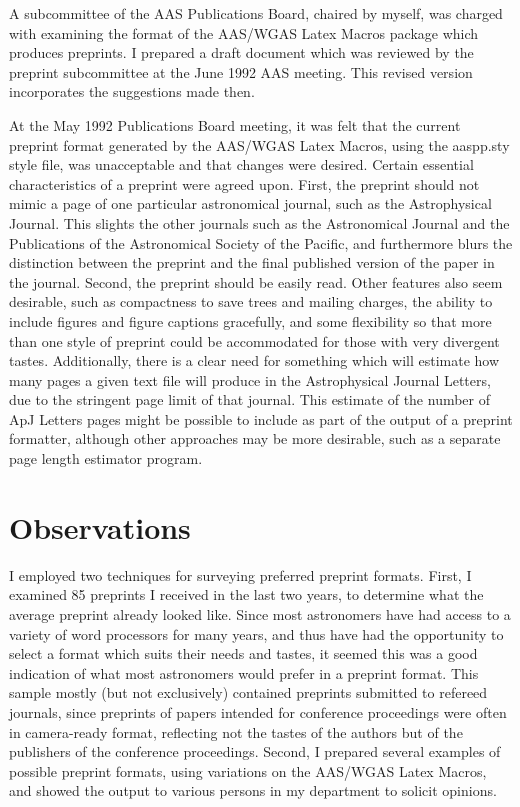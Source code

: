 A subcommittee of the AAS Publications Board, chaired by myself, was charged 
with examining the format of the AAS/WGAS Latex Macros package which
produces preprints.  I prepared a draft document which was reviewed by the
preprint subcommittee at the June 1992 AAS meeting.  This revised version 
incorporates the suggestions made then.

At the May 1992 Publications Board meeting, it was felt that the current 
preprint format generated by the AAS/WGAS Latex Macros, using the aaspp.sty 
style file, was unacceptable and that changes were desired.  Certain 
essential characteristics of a preprint were agreed upon.  First, the 
preprint should not mimic a page of one particular astronomical journal, 
such as the Astrophysical Journal.  This slights the other journals such 
as the Astronomical Journal and the Publications of the Astronomical 
Society of the Pacific, and furthermore blurs the distinction between the 
preprint and the final published version of the paper in the journal.
Second, the preprint should be easily read.  Other features also seem 
desirable, such as compactness to save trees and mailing charges, the 
ability to include figures and figure captions gracefully, and some 
flexibility so that more than one style of preprint could be accommodated 
for those with very divergent tastes.  Additionally, there is a clear need 
for something which will estimate how many pages a given text file will 
produce in the Astrophysical Journal Letters, due to the stringent page 
limit of that journal.  This estimate of the number of ApJ Letters pages 
might be possible to include as part of the output of a preprint formatter, 
although other approaches may be more desirable, such as a separate page 
length estimator program.

\section
{Observations}

I employed two techniques for surveying preferred preprint formats.  First, 
I examined 85 preprints I received in the last two years, to determine what 
the average preprint already looked like.  Since most astronomers have had 
access to a variety of word processors for many years, and thus have had 
the opportunity to select a format which suits their needs and tastes, it 
seemed this was a good indication of what most astronomers would prefer in
a preprint format.  This sample mostly (but not exclusively) contained 
preprints submitted to refereed journals, since preprints of papers intended
for conference proceedings were often in camera-ready format, reflecting not 
the tastes of the authors but of the publishers of the conference proceedings.
Second, I prepared several examples of possible preprint formats, using 
variations on the AAS/WGAS Latex Macros, and showed the output to various 
persons in my department to solicit opinions. 

